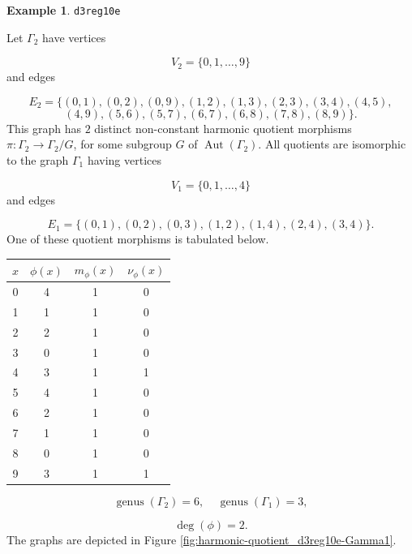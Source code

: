 \documentclass[12pt,letterpaper]{article}
\theoremstyle{definition}
\newtheorem{example}[theorem]{Example}
\DeclareMathOperator{\Aut}{Aut}
\DeclareMathOperator{\genus}{genus}
\begin{document}
\begin{example}%
\label{example:d3reg10e}
  {\tt d3reg10e}\newline
{\rm  
Let $\Gamma_2$ have vertices

\[
V_2=\{0,1,\dots,9\}
\]
and edges

\[
E_2 = \{
(0, 1), (0, 2), (0, 9), (1, 2), (1, 3), (2, 3), (3, 4), (4, 5),
\]
\[
(4, 9), (5, 6), (5, 7), (6, 7), (6, 8), (7, 8), (8, 9)
\}.
\]
This graph has $2$ distinct non-constant harmonic quotient
morphisms $\pi: \Gamma_2\to \Gamma_2/G$, for some subgroup
$G$ of $\Aut(\Gamma_2)$. All quotients are isomorphic to the
graph $\Gamma_1$ having vertices

\[
V_1=\{0,1,\dots,4\}
\]
and edges

\[
E_1 = \{
(0, 1), (0, 2), (0, 3), (1, 2), (1, 4), (2, 4), (3, 4)
\}.
\]
One of these quotient morphisms is tabulated below.
\begin{center}
\begin{tabular}{c|c|c|c}  
  $x$ & $\phi(x)$ & $m_\phi(x)$ & $\nu_\phi(x)$ \\ \hline
  0   &    4   &        1         &  0   \\ 
  1   &    1   &        1         &  0   \\ 
  2   &    2   &        1         &  0   \\ 
  3   &    0   &        1         &  0   \\ 
  4   &    3   &        1         &  1   \\ 
  5   &    4   &        1         &  0    \\ 
  6   &    2   &        1         &  0   \\ 
  7   &    1   &        1         &  0   \\
  8   &    0   &        1         &  0   \\
  9   &    3   &        1         &  1   \\ 
\end{tabular}
\end{center}

\[
  \genus(\Gamma_2) =6,\ \ \ \ \
  \genus(\Gamma_1) =3,
\]

\[
\deg(\phi) =2.
\]
The graphs are depicted in Figure \ref{fig:harmonic-quotient_d3reg10e-Gamma1}.

}
\end{example}
\end{document}
